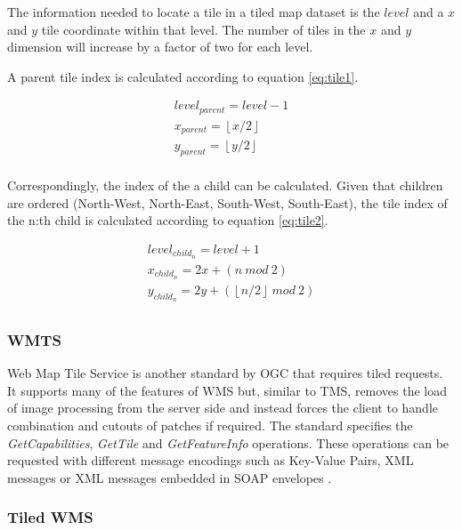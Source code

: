 The information needed to locate a tile in a tiled map dataset is the $level$ and a $x$ and $y$ tile coordinate within that level. The number of tiles in the $x$ and $y$ dimension will increase by a factor of two for each level.

A parent tile index is calculated according to equation \ref{eq:tile1}.

\begin{equation}
\label{eq:tile1}
\begin{split}
level_{parent} = level - 1 \\
x_{parent} = \left\lfloor x / 2 \right\rfloor \\
y_{parent} = \left\lfloor y / 2 \right\rfloor \\
\end{split}
\end{equation}

Correspondingly, the index of the a child can be calculated. Given that children are ordered (North-West, North-East, South-West, South-East), the tile index of the n:th child is calculated according to equation \ref{eq:tile2}.

\begin{equation}
\label{eq:tile2}
\begin{split}
level_{child_n} = level + 1 \\
x_{child_n} = 2 x + ( n ~ mod ~ 2 ) \\
y_{child_n} = 2 y + ( \left\lfloor n / 2 \right\rfloor ~ mod ~ 2 ) \\
\end{split}
\end{equation}



\subsubsection{WMTS}

Web Map Tile Service is another standard by OGC that requires tiled requests. It supports many of the features of WMS but, similar to TMS, removes the load of image processing from the server side and instead forces the client to handle combination and cutouts of patches if required. The standard specifies the \emph{GetCapabilities}, \emph{GetTile} and \emph{GetFeatureInfo} operations. These operations can be requested with different message encodings such as Key-Value Pairs, XML messages or XML messages embedded in SOAP envelopes \cite{wmts10}.

\subsubsection{Tiled WMS}

